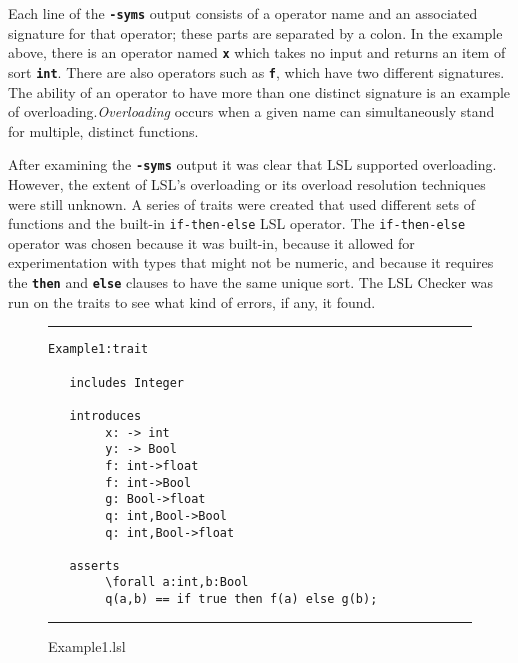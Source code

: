 \documentclass[12pt]{article} %
\newcommand{\reserved}[1]{\textbf{\texttt{#1}}} %
\newcommand{\UNSPACEFORBOX}{\vspace{-2ex}}
\newcommand{\HLINE}{\UNSPACEFORBOX%
\begin{flushleft}\rule{\textwidth}{0.01in}\end{flushleft}%
\UNSPACEFORBOX}
\newenvironment{BFIGURE}{

\begin{figure}
\small
\HLINE
}{
\HLINE
\normalsize
\end{figure}
}
\begin{document}
Each line of the \reserved{-syms} output consists of a operator
name and an associated signature for that operator; these parts are separated by a
colon. In the example above, there is an operator named \reserved{x}
which takes no input and returns an item of sort \reserved{int}. There
are also operators such as \reserved{f}, which have two different
signatures. The ability of an operator to have more than one distinct
signature is an example of overloading.\emph{Overloading} occurs when a
given name can simultaneously stand for multiple, distinct
functions. 

After examining the \reserved{-syms} output it was clear that LSL
supported overloading. However, the extent of LSL's overloading or its
overload resolution techniques were still unknown. A series of traits
were created that used different sets of functions and the built-in
\texttt{if-then-else} LSL operator. The \texttt{if-then-else} operator
was chosen because it was built-in, because it allowed for
experimentation with types that might not be numeric, and because it
requires the
\reserved{then} and \reserved{else} clauses to have the same unique
sort. The LSL Checker was run on the traits to see what kind of errors,
if any, it found.

\begin{BFIGURE}
\begin{verbatim}
Example1:trait

   includes Integer

   introduces
        x: -> int
        y: -> Bool
        f: int->float
        f: int->Bool
        g: Bool->float
        q: int,Bool->Bool
        q: int,Bool->float

   asserts
        \forall a:int,b:Bool
        q(a,b) == if true then f(a) else g(b);
\end{verbatim}
\caption{Example1.lsl}
\label{lslex1}
\end{BFIGURE}
\end{document}
